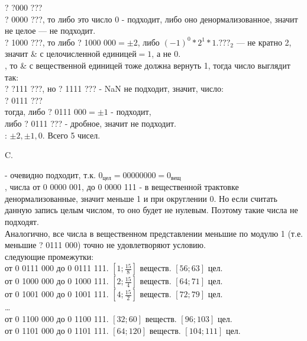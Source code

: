 \documentclass[12pt, letterpaper]{article}
\begin{document}
\noindent? ?000 ???\\

 ? 0000 ???, то либо это число 0 - подходит, либо оно денормализованное, значит не целое — не подходит.\\

 ? 1000 ???, то либо ? 1000 000$=\pm 2$, либо $(-1)^0 * 2^1 *1.???_2$ — не кратно 2, значит \& с целочисленной единицей$ = 1$, а не 0.\\

, то \& с вещественной единицей тоже должна вернуть 1, тогда число выглядит так:\\

\noindent? ?111 ???, но ? 1111 ??? - NaN не подходит, значит, число:\\
? 0111 ???\\
тогда, либо ? 0111 000$=\pm 1$ - подходит,\\
либо ? 0111 ??? - дробное, значит не подходит.\\

: $\pm2, \pm1, 0$. Всего 5 чисел.\\ 

\setlength{\leftskip}{0cm}

\noindent C.

\setlength{\leftskip}{1cm}
 - очевидно подходит, т.к. $0_{\text{цел}} = 00000000 = 0_{\text{вещ}}$\\

, числа от 0 0000 001, до 0 0000 111 - в вещественной трактовке денормализованные, значит меньше 1 и при округлении 0. Но если считать данную запись целым числом, то оно будет не нулевым. Поэтому такие числа не подходят.\\
Аналогично, все числа в вещественном представлении меньшие по модулю 1 (т.е. меньшие ? 0111 000) точно не удовлетворяют условию.\\

 следующие промежутки:\\
от 0 0111 000 до 0 0111 111. $[1;\frac{15}{8}]$ веществ. $[56;63]$ цел.\\
от 0 1000 000 до 0 1000 111. $[2;\frac{15}{4}]$ веществ. $[64;71]$ цел.\\
от 0 1001 000 до 0 1001 111. $[4;\frac{15}{2}]$ веществ. $[72;79]$ цел.\\
\dots\\
от 0 1100 000 до 0 1100 111. $[32;60]$ веществ. $[96;103]$ цел.\\
от 0 1101 000 до 0 1101 111. $[64;120]$ веществ. $[104;111]$ цел.\\
\end{document}
